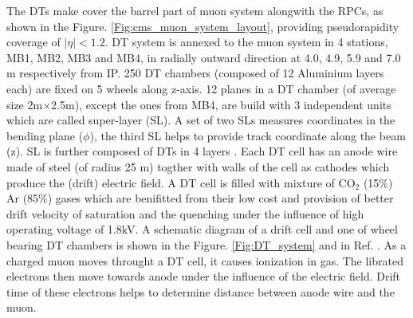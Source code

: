The DTs make cover the barrel part of muon system alongwith the RPCs, as shown in the Figure. \ref{Fig:cms_muon_system_layout}, providing pseudorapidity coverage of $|\eta| < 1.2 $. %
DT system is annexed to the muon system in 4 stations, MB1, MB2, MB3 and MB4, in radially outward direction at 4.0, 4.9, 5.9 and 7.0 m respectively from IP.
250 DT chambers (composed of 12 Aluminium layers each) are fixed on 5 wheels along z-axis. 
12 planes in a DT chamber (of average size 2m$\times$2.5m), except the ones from MB4, are build with 3 independent units which are called super-layer (SL).
A set of two SLs measures coordinates in the bending plane ($\phi$), the third SL helps to provide track coordinate along the beam (z).
SL is further composed of DTs in 4 layers \cite{Paolucci:927394}.  %
Each DT cell has an anode wire made of steel (of radius 25 \micro m) togther with walls of the cell as cathodes which produce the (drift) electric field. 
A DT cell is filled with mixture of CO${}_{2}$ (15\%) Ar (85\%) gases which are benifitted from their low cost and provision of better drift velocity of saturation and the quenching under the influence of high operating voltage of 1.8kV. A schematic diagram of a drift cell and one of wheel bearing DT chambers is shown in the Figure. \ref{Fig:DT_system} and in Ref. \cite{article_dt}. %
As a charged muon moves throught a DT cell, it causes ionization in gas. The librated electrons then move towards anode under the influence of the electric field. Drift time of these electrons helps to determine distance between anode wire and the muon.



